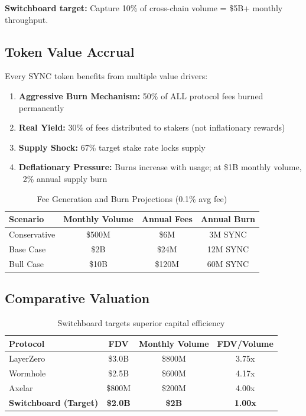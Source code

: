 \documentclass[12pt,a4paper]{article}
\begin{document}
\textbf{Switchboard target:} Capture 10\% of cross-chain volume = \$5B+ monthly throughput.

\subsection{Token Value Accrual}

Every SYNC token benefits from multiple value drivers:

\begin{enumerate}
    \item \textbf{Aggressive Burn Mechanism:} 50\% of ALL protocol fees burned permanently
    \item \textbf{Real Yield:} 30\% of fees distributed to stakers (not inflationary rewards)
    \item \textbf{Supply Shock:} 67\% target stake rate locks supply
    \item \textbf{Deflationary Pressure:} Burns increase with usage; at \$1B monthly volume, ~2\% annual supply burn
\end{enumerate}

\begin{table}[h]
\centering
\begin{tabular}{lccc}
\toprule
\textbf{Scenario} & \textbf{Monthly Volume} & \textbf{Annual Fees} & \textbf{Annual Burn} \\
\midrule
Conservative & \$500M & \$6M & 3M SYNC \\
Base Case & \$2B & \$24M & 12M SYNC \\
Bull Case & \$10B & \$120M & 60M SYNC \\
\bottomrule
\end{tabular}
\caption{Fee Generation and Burn Projections (0.1\% avg fee)}
\end{table}

\subsection{Comparative Valuation}

\begin{table}[h]
\centering
\begin{tabular}{lccc}
\toprule
\textbf{Protocol} & \textbf{FDV} & \textbf{Monthly Volume} & \textbf{FDV/Volume} \\
\midrule
LayerZero & \$3.0B & \$800M & 3.75x \\
Wormhole & \$2.5B & \$600M & 4.17x \\
Axelar & \$800M & \$200M & 4.00x \\
\textbf{Switchboard (Target)} & \textbf{\$2.0B} & \textbf{\$2B} & \textbf{1.00x} \\
\bottomrule
\end{tabular}
\caption{Switchboard targets superior capital efficiency}
\end{table}
\end{document}
